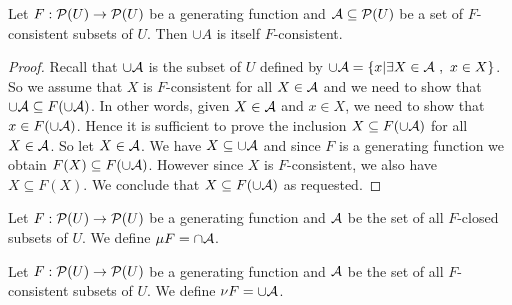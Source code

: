 \begin{prop}\label{logic:prop:genfun:consistent:union}
  Let $F:{\cal P}(U)\rightarrow{\cal P}(U)$ be a generating function and 
  ${\cal A}\subseteq{\cal P}(U)$ be a set of $F$-consistent subsets of $U$. 
  Then $\cup A$ is itself $F$-consistent.
\end{prop}
\begin{proof}
  Recall that $\cup{\cal A}$ is the subset of $U$ defined by 
  $\cup{\cal A}=\{x| \exists X\in{\cal A}\ ,\ x\in X\}$. 
  So we assume that $X$ is $F$-consistent for all $X\in{\cal A}$ 
  and we need to show that $\cup{\cal A}\subseteq F(\cup{\cal A})$. 
  In other words, given $X\in{\cal A}$ and $x\in X$, we need to show that 
  $x\in F(\cup{\cal A})$. Hence it is sufficient to prove the inclusion 
  $X\subseteq F(\cup{\cal A})$ for all $X\in{\cal A}$. So let $X\in{\cal A}$. 
  We have $X\subseteq\cup{\cal A}$ and since $F$ is a generating function we obtain
  $F(X)\subseteq F(\cup{\cal A})$. However since $X$ is $F$-consistent, we also 
  have $X\subseteq F(X)$. We conclude that $X\subseteq F(\cup{\cal A})$
  as requested.
\end{proof}

\begin{defin}\label{logic:prop:genfun:mu}
  Let $F:{\cal P}(U)\rightarrow{\cal P}(U)$ be a generating function and 
  ${\cal A}$ be the set of all $F$-closed subsets of $U$. We define 
  $\mu F=\cap{\cal A}$.
\end{defin}


\begin{defin}\label{logic:prop:genfun:nu}
  Let $F:{\cal P}(U)\rightarrow{\cal P}(U)$ be a generating function and 
  ${\cal A}$ be the set of all $F$-consistent subsets of $U$. We define 
  $\nu F=\cup{\cal A}$.
\end{defin}



